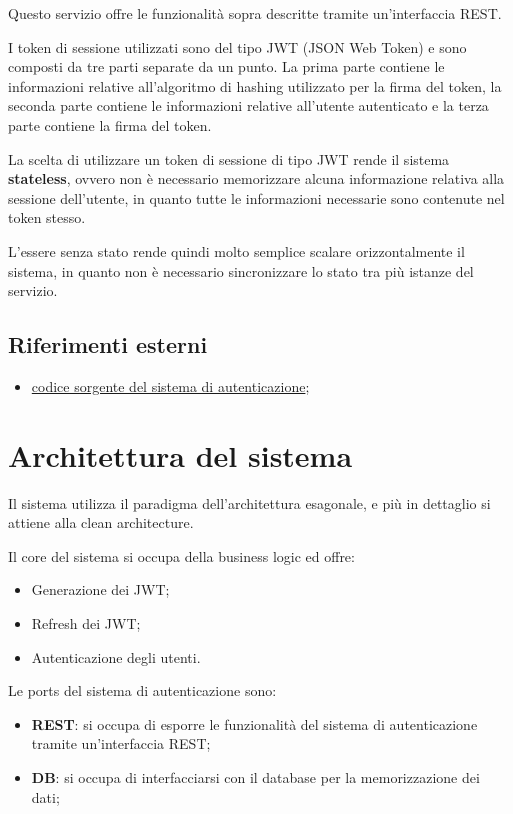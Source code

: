 Questo servizio offre le funzionalità sopra descritte tramite un'interfaccia REST.

I token di sessione utilizzati sono del tipo JWT (JSON Web Token) e sono composti da tre parti separate da un punto. La prima parte contiene le informazioni relative all'algoritmo di hashing utilizzato per la firma del token, la seconda parte contiene le informazioni relative all'utente autenticato e la terza parte contiene la firma del token.

La scelta di utilizzare un token di sessione di tipo JWT rende il sistema \textbf{stateless}, ovvero non è necessario memorizzare alcuna informazione relativa alla sessione dell'utente, in quanto tutte le informazioni necessarie sono contenute nel token stesso.

L'essere senza stato rende quindi molto semplice scalare orizzontalmente il sistema, in quanto non è necessario sincronizzare lo stato tra più istanze del servizio.

\subsection{Riferimenti esterni}

\begin{itemize}
    \item \href{https://github.com/SWEasabi/authentication-micro-service}{codice sorgente del sistema di autenticazione};
\end{itemize}

\section{Architettura del sistema}

Il sistema utilizza il paradigma dell'architettura esagonale, e più in dettaglio si attiene alla clean architecture.

Il core del sistema si occupa della business logic ed offre:
\begin{itemize}
    \item Generazione dei JWT;
    \item Refresh dei JWT;
    \item Autenticazione degli utenti.
\end{itemize}

Le ports del sistema di autenticazione sono:
\begin{itemize}
    \item \textbf{REST}: si occupa di esporre le funzionalità del sistema di autenticazione tramite un'interfaccia REST;
    \item \textbf{DB}: si occupa di interfacciarsi con il database per la memorizzazione dei dati;
\end{itemize}

